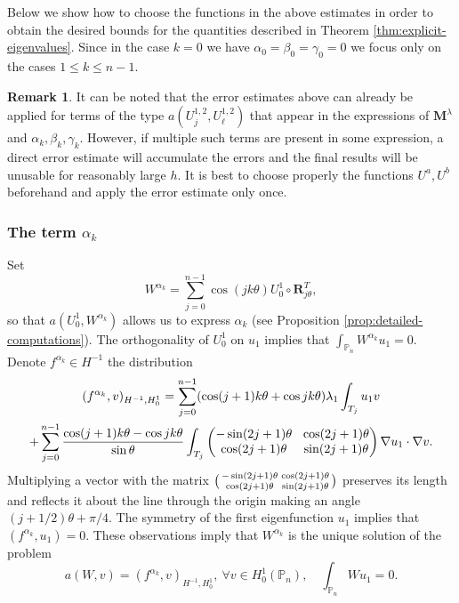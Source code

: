 \documentclass[JEP,XML,SOM,Unicode,ThmDefs,NoFloatCountersInSection,published]{cedram}
\newenvironment{smallpmatrix}{\big(\begin{smallmatrix}}{\end{smallmatrix}\big)}
\newcommand{\colsep}{\arraycolsep4.5pt}
\theoremstyle{plain}
\theoremstyle{definition}
\newtheorem{rem}[thm]{Remark}
\newcommand{\bo}[1]{{\boldsymbol#1}}
\def\Pp{{\mathbb{P}_n}}
\begin{document}
Below we show how to choose the functions in the above estimates in order to obtain the desired bounds for the quantities described in Theorem \ref{thm:explicit-eigenvalues}. Since in the case $k=0$ we have $\alpha_0=\beta_0=\gamma_0=0$ we focus only on the cases $1\leq k \leq n-1$.

\begin{rem}
\rm
It can be noted that the error estimates above can already be applied for terms of the type $a(U_j^{1,2},U_\ell^{1,2})$ that appear in the expressions of $\bo M^\lambda$ and $\alpha_k,\beta_k,\gamma_k$. However, if multiple such terms are present in some expression, a direct error estimate will accumulate the errors and the final results will be unusable for reasonably large $h$. It is best to choose properly the functions $U^a,U^b$ beforehand and apply the error estimate only once.
\label{rem:why-choose-different-functions}
\end{rem}

\subsubsection*{The term $\alpha_k$} Set
\[
W^{\alpha_k} = \sum_{j=0}^{n-1} \cos(jk\theta) U_0^1\circ \bo R_{j\theta}^T,
\]
so that $a(U_0^1,W^{\alpha_k})$ allows us to express $\alpha_k$ (see Proposition \ref{prop:detailed-computations}). The orthogonality of $U_0^1$ on $u_1$ implies that $\int_\Pp W^{\alpha_k}u_1=0$. Denote $f^{\alpha_k} \in H^{-1}$ the distribution
\vspace*{-5pt}
\begin{multline*}
(f^{\alpha_k},v)_{H^{-1},H_0^1}
= \sum_{j=0}^{n-1} (\cos (j+1)k\theta+\cos jk\theta) \lambda_1\int_{T_j} u_1 v\\ \colsep
+ \sum_{j=0}^{n-1} \frac{\cos(j+1)k\theta-\cos jk\theta}{\sin \theta} \int_{T_j}\begin{pmatrix}
-\sin (2j+1)\theta & \cos (2j+1) \theta \\
\cos(2j+1)\theta & \sin (2j+1)\theta
\end{pmatrix}\nabla u_1 \cdot \nabla v.
\end{multline*}
Multiplying a vector with the matrix $\begin{smallpmatrix}
-\sin (2j+1)\theta & \cos (2j+1) \theta \\
\cos(2j+1)\theta & \sin (2j+1)\theta
\end{smallpmatrix}$ preserves its length and reflects it about the line through the origin making an angle $(j+1/2)\theta+\pi/4$. The symmetry of the first eigenfunction $u_1$ implies that $(f^{\alpha_k},u_1) = 0$. These observations imply that $W^{\alpha_k}$ is the unique solution of the problem
\[
a(W,v) = (f^{\alpha_k},v)_{H^{-1},H_0^1},\ \forall v \in H_0^1(\Pp),\quad \int_\Pp Wu_1=0.
\]
\end{document}
